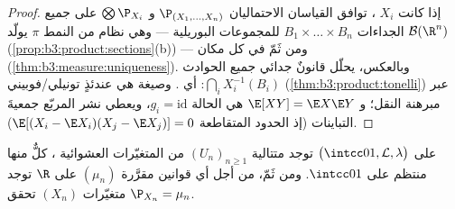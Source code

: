 \begin{proof}
إذا كانت $X_i$ ، توافق القياسان الاحتماليان $\P_{(X_1,\dots,X_n)}$
و $\bigotimes\P_{X_i}$ على جميع الجداءات $B_1\times\dots\times B_n$ للمجموعات البوريلية --- وهي
نظام من النمط $\pi$ يولّد $\mathcal B(\R^n)$ (\cref{prop:b3:product:sections}(b)) --- ومن ثَمّ
في كل مكان (\cref{thm:b3:measure:uniqueness}). وبالعكس، يحلّل قانونٌ جدائي جميع
الحوادث $\bigcap_iX_i^{-1}(B_i)$: أي . وصيغة  هي عندئذٍ
تونيلي/فوبيني (\cref{thm:b3:product:tonelli}) عبر مبرهنة النقل؛ و $\E[XY] = \E X\E Y$ هي الحالة
$g_i =
\mathrm{id}$، ويعطي نشر المربّع جمعيةَ التباينات (إذ الحدود المتقاطعة
$\E[(X_i - \E X_i)(X_j - \E X_j)]
= 0$).
\end{proof}

\begin{theorem}
\label{thm:b3:probability:existence}
على $\bigl(\intcc01, \mathcal L, \lambda\bigr)$ توجد متتالية $(U_n)_{n\geq1}$ من المتغيّرات
العشوائية ، كلٌّ منها منتظم على $\intcc01$. ومن ثَمّ،
من أجل أي قوانين مقرَّرة $(\mu_n)$ على $\R$ توجد متغيّرات
 $(X_n)$ تحقق $\P_{X_n} = \mu_n$.
\end{theorem}

